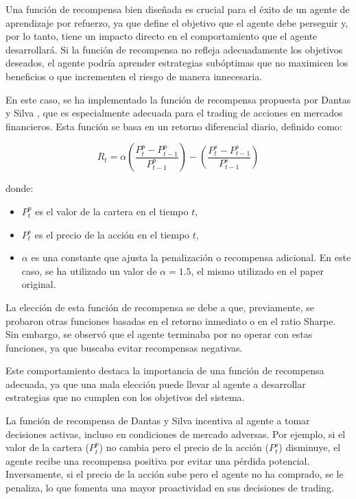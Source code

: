 \documentclass[a4paper,12pt, twoside]{report}
\begin{document}
Una función de recompensa bien diseñada es crucial para el éxito de un agente de aprendizaje por 
refuerzo, ya que define el objetivo que el agente debe perseguir y, por lo tanto, tiene un impacto 
directo en el comportamiento que el agente desarrollará. Si la función de recompensa no refleja 
adecuadamente los objetivos deseados, el agente podría aprender estrategias subóptimas que no 
maximicen los beneficios o que incrementen el riesgo de manera innecesaria.

En este caso, se ha implementado la función de recompensa propuesta por Dantas y Silva \cite{Dantas2018}, 
que es especialmente adecuada para el trading de acciones en mercados financieros. Esta función 
se basa en un retorno diferencial diario, definido como:

\[
R_t = \alpha \left(\frac{P^p_t - P^p_{t-1}}{P^p_{t-1}}\right) - \left(\frac{P^s_t - P^s_{t-1}}{P^s_{t-1}}\right)
\]

donde:
\begin{itemize}
    \item \( P^p_t \) es el valor de la cartera en el tiempo \( t \),
    \item \( P^s_t \) es el precio de la acción en el tiempo \( t \),
    \item \( \alpha \) es una constante que ajusta la penalización o recompensa adicional. 
    En este caso, se ha utilizado un valor de \( \alpha = 1.5 \), el mismo utilizado en el paper original.
\end{itemize}

La elección de esta función de recompensa se debe a que, previamente, se probaron otras funciones 
basadas en el retorno inmediato o en el ratio Sharpe. Sin embargo, se observó que el agente terminaba 
por no operar con estas funciones, ya que buscaba evitar recompensas negativas. 

Este comportamiento destaca la importancia de una función de recompensa adecuada, ya que una mala 
elección puede llevar al agente a desarrollar estrategias que no cumplen con los objetivos del sistema.

La función de recompensa de Dantas y Silva incentiva al agente a tomar decisiones activas, incluso 
en condiciones de mercado adversas. Por ejemplo, si el valor de la cartera (\( P^p_t \)) no 
cambia pero el precio de la acción (\( P^s_t \)) disminuye, el agente recibe una recompensa positiva 
por evitar una pérdida potencial. Inversamente, si el precio de la acción sube pero el agente no 
ha comprado, se le penaliza, lo que fomenta una mayor proactividad en sus decisiones de trading.
\end{document}
